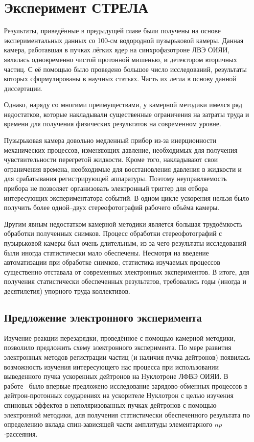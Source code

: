 \chapter{Эксперимент СТРЕЛА}
Результаты, приведённые в предыдущей главе были получены на основе
экспериментальных данных со 100-см водородной пузырьковой камеры. Данная камера,
работавшая в пучках лёгких ядер на синхрофазотроне ЛВЭ ОИЯИ, являлась
одновременно чистой протонной мишенью, и детектором вторичных частиц. С её
помощью было проведено большое число исследований, результаты которых
сформулированы в научных статьях. Часть их легла в основу данной диссертации.

Однако, наряду со многими преимуществами, у камерной методики имелся ряд
недостатков, которые накладывали существенные ограничения на затраты труда и
времени для получения физических результатов на современном уровне.

Пузырьковая камера довольно медленный прибор из-за инерционности механических
процессов, изменяющих давление, необходимых для получения чувствительности
перегретой жидкости. Кроме того, накладывают свои ограничения времена,
необходимые для восстановления давления в жидкости и для срабатывания
регистрирующей аппаратуры. Поэтому неуправляемость прибора не позволяет
организовать электронный триггер для отбора интересующих экспериментатора
событий. В одном цикле ускорения нельзя было получить более одной--двух
стереофотографий рабочего объёма камеры.

Другим явным недостатком камерной методики является большая трудоёмкость
обработки полученных снимков. Процесс обработки стереофотографий с пузырьковой
камеры был очень длительным, из-за чего результаты исследований были иногда
статистически мало обеспечены. Несмотря на введение автоматизации при
обработке снимков, статистика изучаемых процессов существенно отставала от
современных электронных экспериментов. В итоге, для получения статистически
обеспеченных результатов, требовались годы (иногда и десятилетия) упорного труда
коллективов.

\section{Предложение электронного эксперимента}
Изучение реакции перезарядки, проведённое с помощью камерной методики, позволило
предложить схему электронного эксперимента. По мере развития электронных методов
регистрации частиц (и наличия пучка дейтронов) появилась возможность изучения
интересующего нас процесса при использовании выведенного пучка ускоренных
дейтронов на Нуклотроне ЛФВЭ ОИЯИ. В работе~\cite{glagolev96} было впервые
предложено исследование зарядово-обменных процессов в дейтрон-протонных
соударениях на ускорителе Нуклотрон с целью изучения спиновых эффектов в
неполяризованных пучках дейтронов с помощью электронной методики, для получения
статистически обеспеченного результата по определению вклада спин-зависящей
части амплитуды элементарного $np$-рассеяния.

